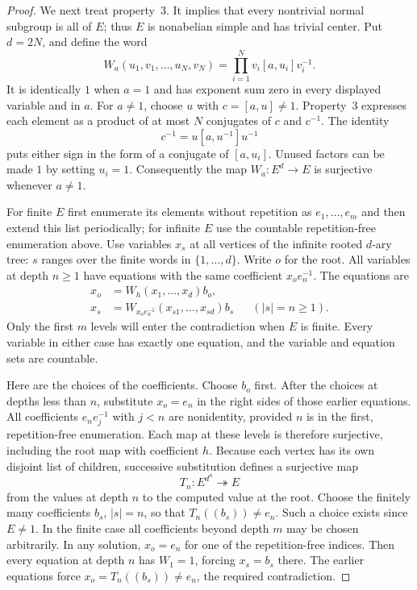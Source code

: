 \begin{proof}
We next treat property~3. It implies that every nontrivial
normal subgroup is all of $E$; thus $E$ is nonabelian simple
and has trivial center. Put $d=2N$, and define the word
\[
 W_a(u_1,v_1,\ldots,u_N,v_N)
     =\prod_{i=1}^{N}v_i[a,u_i]v_i^{-1}.
 \tag{A.27.7}
\]
It is identically $1$ when $a=1$ and has exponent sum zero
in every displayed variable and in $a$. For $a\ne1$, choose
$u$ with $c=[a,u]\ne1$. Property~3 expresses each element as
a product of at most $N$ conjugates of $c$ and $c^{-1}$.
The identity
\[
 c^{-1}=u[a,u^{-1}]u^{-1}
\]
puts either sign in the form of a conjugate of $[a,u_i]$.
Unused factors can be made $1$ by setting $u_i=1$.
Consequently the map $W_a:E^d\to E$ is surjective whenever
$a\ne1$.

For finite $E$ first enumerate its elements without repetition
as $e_1,\ldots,e_m$ and then extend this list periodically;
for infinite $E$ use the countable repetition-free enumeration
above. Use variables $x_s$ at all vertices of the infinite
rooted $d$-ary tree: $s$ ranges over the finite words in
$\{1,\ldots,d\}$. Write $o$ for the root. All variables at
depth $n\geq1$ have equations with the same coefficient
$x_oe_n^{-1}$. The equations are
\[
 \begin{aligned}
 x_o&=W_h(x_1,\ldots,x_d)b_o,\\
 x_s&=W_{x_oe_n^{-1}}(x_{s1},\ldots,x_{sd})b_s
       &&(|s|=n\geq1).
 \end{aligned}
 \tag{A.27.8}
\]
Only the first $m$ levels will enter the contradiction when
$E$ is finite. Every variable in either case has exactly one
equation, and the variable and equation sets are countable.

Here are the choices of the coefficients. Choose $b_o$ first.
After the choices at depths less than $n$, substitute
$x_o=e_n$ in the right sides of those earlier equations.
All coefficients $e_ne_j^{-1}$ with $j<n$ are nonidentity,
provided $n$ is in the first, repetition-free enumeration.
Each map at these levels is therefore surjective, including
the root map with coefficient $h$. Because each vertex has
its own disjoint list of children, successive substitution
defines a surjective map
\[
 T_n:E^{d^n}\twoheadrightarrow E
 \tag{A.27.9}
\]
from the values at depth $n$ to the computed value at the root.
Choose the finitely many coefficients $b_s$, $|s|=n$, so that
$T_n((b_s))\ne e_n$. Such a choice exists since $E\ne1$.
In the finite case all coefficients beyond depth $m$ may be
chosen arbitrarily. In any solution, $x_o=e_n$ for one of
the repetition-free indices. Then every equation at depth
$n$ has $W_1=1$, forcing $x_s=b_s$ there. The earlier
equations force $x_o=T_n((b_s))\ne e_n$, the required
contradiction.


\end{proof}
